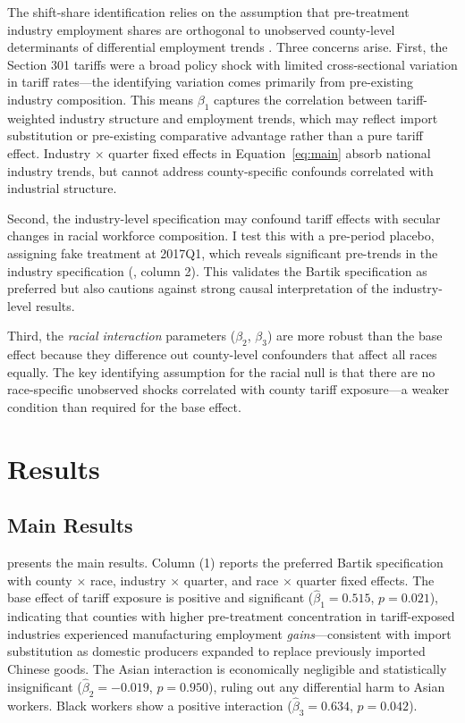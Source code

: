 \documentclass[12pt]{article}
\begin{document}
The shift-share identification relies on the assumption that pre-treatment industry employment shares are orthogonal to unobserved county-level determinants of differential employment trends \citep{borusyak2022quasi,goldsmith2020bartik}. Three concerns arise. First, the Section 301 tariffs were a broad policy shock with limited cross-sectional variation in tariff rates---the identifying variation comes primarily from pre-existing industry composition. This means $\beta_1$ captures the correlation between tariff-weighted industry structure and employment trends, which may reflect import substitution or pre-existing comparative advantage rather than a pure tariff effect. Industry $\times$ quarter fixed effects in Equation~\ref{eq:main} absorb national industry trends, but cannot address county-specific confounds correlated with industrial structure.

Second, the industry-level specification may confound tariff effects with secular changes in racial workforce composition. I test this with a pre-period placebo, assigning fake treatment at 2017Q1, which reveals significant pre-trends in the industry specification (, column 2). This validates the Bartik specification as preferred but also cautions against strong causal interpretation of the industry-level results.

Third, the \textit{racial interaction} parameters ($\beta_2$, $\beta_3$) are more robust than the base effect because they difference out county-level confounders that affect all races equally. The key identifying assumption for the racial null is that there are no race-specific unobserved shocks correlated with county tariff exposure---a weaker condition than required for the base effect.


\section{Results}\label{sec:results}

\subsection{Main Results}

 presents the main results. Column (1) reports the preferred Bartik specification with county $\times$ race, industry $\times$ quarter, and race $\times$ quarter fixed effects. The base effect of tariff exposure is positive and significant ($\hat{\beta}_1 = 0.515$, $p = 0.021$), indicating that counties with higher pre-treatment concentration in tariff-exposed industries experienced manufacturing employment \textit{gains}---consistent with import substitution as domestic producers expanded to replace previously imported Chinese goods. The Asian interaction is economically negligible and statistically insignificant ($\hat{\beta}_2 = -0.019$, $p = 0.950$), ruling out any differential harm to Asian workers. Black workers show a positive interaction ($\hat{\beta}_3 = 0.634$, $p = 0.042$).
\end{document}
